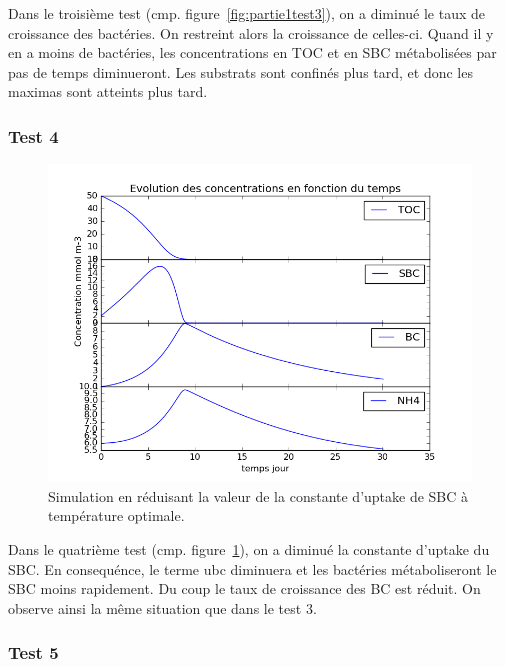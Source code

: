 \par{
Dans le troisième test (cmp. figure~\ref{fig:partie1test3}), on a diminué le taux de croissance des bact\'eries. On restreint alors la croissance de celles-ci.
Quand il y en a moins de bact\'eries, les concentrations en TOC et en SBC métabolisées par pas de temps diminueront. Les
substrats sont confinés plus tard, et donc les maximas sont atteints plus tard.
}

\FloatBarrier
\newpage
\subsubsection{Test 4}

\begin{figure}[h!]
  \includegraphics[width=\textwidth]{partie1/Test4.png}
  \caption{Simulation en r\'eduisant la valeur de la constante d'uptake de SBC \`a temp\'erature optimale.}
  \label{fig:partie1test4}
\end{figure}

\par{
Dans le quatrième test (cmp. figure~\ref{fig:partie1test4}), on a diminué la constante d'uptake du SBC. En consequénce, le terme ubc diminuera et
les bact\'eries métaboliseront le SBC moins rapidement. Du coup le taux de croissance des BC est r\'eduit. On observe
ainsi la même situation que dans le test 3.
}

\FloatBarrier
\newpage
\subsubsection{Test 5}


